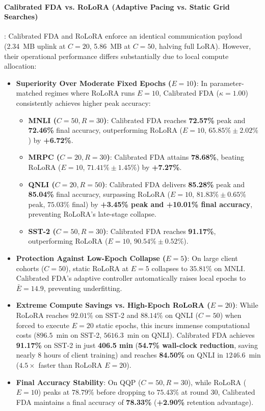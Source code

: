 \documentclass[10pt,a4paper]{article}
\begin{document}
\paragraph{Calibrated FDA vs. RoLoRA (Adaptive Pacing vs. Static Grid Searches)}:
Calibrated FDA and RoLoRA enforce an identical communication payload (2.34~MB uplink at $C=20$, 5.86~MB at $C=50$, halving full LoRA). However, their operational performance differs substantially due to local compute allocation:
\begin{itemize}
    \item \textbf{Superiority Over Moderate Fixed Epochs ($E=10$)}: In parameter-matched regimes where RoLoRA runs $E=10$, Calibrated FDA ($\kappa=1.00$) consistently achieves higher peak accuracy:
    \begin{itemize}
        \item \textbf{MNLI ($C=50, R=30$)}: Calibrated FDA reaches \textbf{72.57\%} peak and \textbf{72.46\%} final accuracy, outperforming RoLoRA ($E=10$, $65.85\% \pm 2.02\%$) by \textbf{+6.72\%}.
        \item \textbf{MRPC ($C=20, R=30$)}: Calibrated FDA attains \textbf{78.68\%}, beating RoLoRA ($E=10$, $71.41\% \pm 1.45\%$) by \textbf{+7.27\%}.
        \item \textbf{QNLI ($C=20, R=50$)}: Calibrated FDA delivers \textbf{85.28\%} peak and \textbf{85.04\%} final accuracy, surpassing RoLoRA ($E=10$, $81.83\% \pm 0.65\%$ peak, $75.03\%$ final) by \textbf{+3.45\% peak and +10.01\% final accuracy}, preventing RoLoRA's late-stage collapse.
        \item \textbf{SST-2 ($C=50, R=30$)}: Calibrated FDA reaches \textbf{91.17\%}, outperforming RoLoRA ($E=10$, $90.54\% \pm 0.52\%$).
    \end{itemize}
    \item \textbf{Protection Against Low-Epoch Collapse ($E=5$)}: On large client cohorts ($C=50$), static RoLoRA at $E=5$ collapses to $35.81\%$ on MNLI. Calibrated FDA's adaptive controller automatically raises local epochs to $\bar{E} = 14.9$, preventing underfitting.
    \item \textbf{Extreme Compute Savings vs. High-Epoch RoLoRA ($E=20$)}: While RoLoRA reaches $92.01\%$ on SST-2 and $88.14\%$ on QNLI ($C=50$) when forced to execute $E=20$ static epochs, this incurs immense computational costs ($896.5$~min on SST-2, $5616.3$~min on QNLI). Calibrated FDA achieves \textbf{91.17\%} on SST-2 in just \textbf{406.5 min} (\textbf{54.7\% wall-clock reduction}, saving nearly 8 hours of client training) and reaches \textbf{84.50\%} on QNLI in $1246.6$~min ($4.5\times$ faster than RoLoRA $E=20$).
    \item \textbf{Final Accuracy Stability}: On QQP ($C=50, R=30$), while RoLoRA ($E=10$) peaks at $78.79\%$ before dropping to $75.43\%$ at round 30, Calibrated FDA maintains a final accuracy of \textbf{78.33\%} (\textbf{+2.90\%} retention advantage).
\end{itemize}
\end{document}
